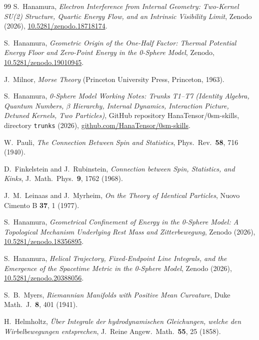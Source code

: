 \documentclass[%
 reprint, amsmath,amssymb, aps, prb, ]{revtex4-2}
\numberwithin{equation}{section}
\begin{document}
\begin{thebibliography}{99}
S.~Hanamura,
\emph{Electron Interference from Internal Geometry: Two-Kernel SU(2) Structure, Quartic Energy Flow, and an Intrinsic Visibility Limit},
Zenodo (2026), \href{https://doi.org/10.5281/zenodo.18718174}{10.5281/zenodo.18718174}.

S.~Hanamura,
\emph{Geometric Origin of the One-Half Factor: Thermal Potential Energy Floor and Zero-Point Energy in the 0-Sphere Model},
Zenodo, \href{https://doi.org/10.5281/zenodo.19010945}{10.5281/zenodo.19010945}.

J.~Milnor,
\emph{Morse Theory}
(Princeton University Press, Princeton, 1963).

S.~Hanamura,
\emph{0-Sphere Model Working Notes: Trunks T1--T7 (Identity Algebra, Quantum Numbers, $\beta$ Hierarchy, Internal Dynamics, Interaction Picture, Detuned Kernels, Two Particles)},
GitHub repository HanaTensor/0sm-skills, directory \texttt{trunks} (2026), \href{https://github.com/HanaTensor/0sm-skills}{github.com/HanaTensor/0sm-skills}.

W.~Pauli,
\emph{The Connection Between Spin and Statistics},
Phys.~Rev.\ \textbf{58}, 716 (1940).

D.~Finkelstein and J.~Rubinstein,
\emph{Connection between Spin, Statistics, and Kinks},
J.~Math.~Phys.\ \textbf{9}, 1762 (1968).

J.~M.~Leinaas and J.~Myrheim,
\emph{On the Theory of Identical Particles},
Nuovo Cimento B \textbf{37}, 1 (1977).

S.~Hanamura,
\emph{Geometrical Confinement of Energy in the 0-Sphere Model: A Topological Mechanism Underlying Rest Mass and Zitterbewegung},
Zenodo (2026), \href{https://doi.org/10.5281/zenodo.18356895}{10.5281/zenodo.18356895}.

S.~Hanamura,
\emph{Helical Trajectory, Fixed-Endpoint Line Integrals, and the Emergence of the Spacetime Metric in the 0-Sphere Model},
Zenodo (2026), \href{https://doi.org/10.5281/zenodo.20388056}{10.5281/zenodo.20388056}.

S.~B.~Myers,
\emph{Riemannian Manifolds with Positive Mean Curvature},
Duke Math.~J.\ \textbf{8}, 401 (1941).

H.~Helmholtz,
\emph{\"Uber Integrale der hydrodynamischen Gleichungen, welche den Wirbelbewegungen entsprechen},
J.~Reine Angew.~Math.\ \textbf{55}, 25 (1858).


\end{thebibliography}
\end{document}
